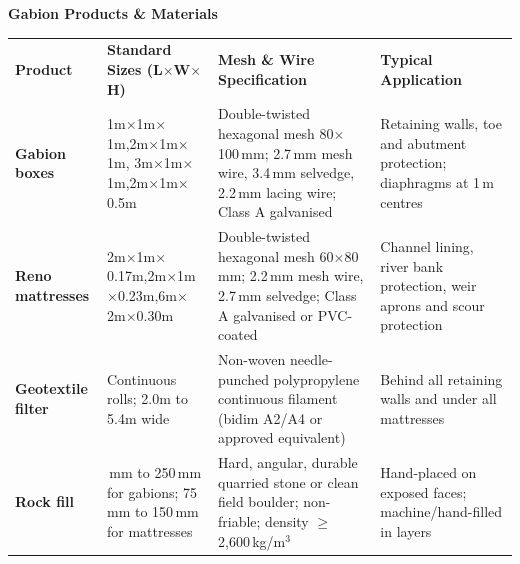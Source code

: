 \documentclass[a4paper,11pt]{article}
\begin{document}
\noindent
{\large\bfseries\color{mhnavy} Gabion Products \& Materials}
\vspace{0.15cm}

\renewcommand{\arraystretch}{1.35}
\noindent
\begin{tabularx}{\textwidth}{@{}p{2.6cm} p{3.4cm} X p{4.3cm}@{}}
\rowcolor{mhnavy}
{\color{white}\bfseries\fontsize{8.0pt}{9.8pt}\selectfont Product} &
{\color{white}\bfseries\fontsize{8.0pt}{9.8pt}\selectfont Standard Sizes (L$\times$W$\times$H)} &
{\color{white}\bfseries\fontsize{8.0pt}{9.8pt}\selectfont Mesh \& Wire Specification} &
{\color{white}\bfseries\fontsize{8.0pt}{9.8pt}\selectfont Typical Application} \\
\rowcolor{mhbluelight}
\fontsize{7.6pt}{9.5pt}\selectfont\bfseries Gabion boxes & \fontsize{7.6pt}{9.5pt}\selectfont 1m$\times$1m$\times$1m,\newline 2m$\times$1m$\times$1m, 3m$\times$1m$\times$1m,\newline 2m$\times$1m$\times$0.5m & \fontsize{7.6pt}{9.5pt}\selectfont Double-twisted hexagonal mesh 80$\times$100\,mm; 2.7\,mm mesh wire, 3.4\,mm selvedge, 2.2\,mm lacing wire; Class A galvanised & \fontsize{7.6pt}{9.5pt}\selectfont Retaining walls, toe and abutment protection; diaphragms at 1\,m centres \\
\fontsize{7.6pt}{9.5pt}\selectfont\bfseries Reno mattresses & \fontsize{7.6pt}{9.5pt}\selectfont 2m$\times$1m$\times$0.17m,\newline 2m$\times$1m$\times$0.23m,\newline 6m$\times$2m$\times$0.30m & \fontsize{7.6pt}{9.5pt}\selectfont Double-twisted hexagonal mesh 60$\times$80\,mm; 2.2\,mm mesh wire, 2.7\,mm selvedge; Class A galvanised or PVC-coated & \fontsize{7.6pt}{9.5pt}\selectfont Channel lining, river bank protection, weir aprons and scour protection \\
\rowcolor{mhbluelight}
\fontsize{7.6pt}{9.5pt}\selectfont\bfseries Geotextile filter & \fontsize{7.6pt}{9.5pt}\selectfont Continuous rolls; 2.0m to 5.4m wide & \fontsize{7.6pt}{9.5pt}\selectfont Non-woven needle-punched polypropylene continuous filament (bidim A2/A4 or approved equivalent) & \fontsize{7.6pt}{9.5pt}\selectfont Behind all retaining walls and under all mattresses \\
\fontsize{7.6pt}{9.5pt}\selectfont\bfseries Rock fill & \fontsize{7.6pt}{9.5pt}\selectfont 100\,mm to 250\,mm for gabions; 75\,mm to 150\,mm for mattresses & \fontsize{7.6pt}{9.5pt}\selectfont Hard, angular, durable quarried stone or clean field boulder; non-friable; density $\geq$ 2,600\,kg/m$^3$ & \fontsize{7.6pt}{9.5pt}\selectfont Hand-placed on exposed faces; machine/hand-filled in layers \\
\end{tabularx}
\renewcommand{\arraystretch}{1}
\end{document}
